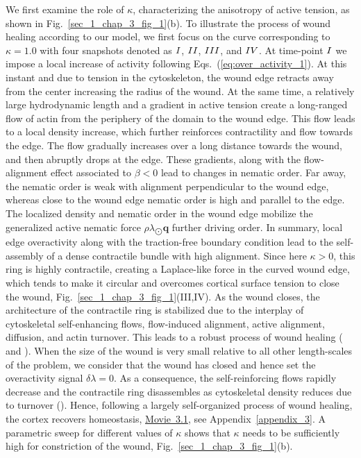 We first examine the role of $\kappa$, characterizing the anisotropy of active tension, as shown in Fig.~\ref{sec_1_chap_3_fig_1}(b). To illustrate the process of wound healing according to our model, we first focus on the curve corresponding to $\kappa=1.0$ with four snapshots denoted as $\rom{1}$, $\rom{2}$, $\rom{3}$, and  $\rom{4}$.  At time-point $\rom{1}$ we impose a local increase of activity following Eqs.~(\ref{eq:over_activity_1}). At this instant and due to tension in the cytoskeleton, the wound edge retracts away from the center increasing the radius of the wound. At the same time, a relatively large hydrodynamic length and a gradient in active tension create a long-ranged flow of actin from the periphery of the domain to the wound edge. This flow leads to a local density increase, which further reinforces contractility and  flow towards the edge. The flow gradually increases over a long distance towards the wound, and then abruptly  drops at the edge. These gradients, along with the flow-alignment effect associated to $\beta<0$ lead to changes in nematic order. Far away, the nematic order is weak with alignment perpendicular to the wound edge, whereas close to the wound edge nematic order is high and parallel to the edge. The localized density and nematic order in the wound edge mobilize the generalized active nematic force $\rho\lambda_{\bigodot}\bm{q}$ further driving order. In summary, local edge overactivity along with the traction-free boundary condition lead to the self-assembly of a dense contractile bundle with high alignment. Since here $\kappa >0$, this ring is highly contractile, creating a Laplace-like force in the curved wound edge, which tends to make it circular and overcomes cortical surface tension to close the wound, Fig.~\ref{sec_1_chap_3_fig_1}(III,IV). As the wound closes, the architecture of the contractile ring is stabilized due to the interplay of cytoskeletal self-enhancing flows, flow-induced alignment, active alignment, diffusion, and actin turnover. This leads to a robust process of wound healing ( and ). 
When the size of the wound is very small relative to all other length-scales of the problem, we consider that the wound has closed and hence set the overactivity signal $\delta \lambda=0$. As a consequence,  the self-reinforcing flows rapidly decrease and  the contractile ring disassembles as cytoskeletal density reduces due to turnover (). Hence, following a largely self-organized process of wound healing, the cortex recovers homeostasis,  
\href{https://github.com/waleedmirzaPhD/movies_thesis.git}{Movie~3.1}, see Appendix~\ref{appendix_3}. A parametric sweep for different values of $\kappa$ shows that $\kappa$ needs to be sufficiently high for constriction of the wound, Fig.~\ref{sec_1_chap_3_fig_1}(b).

